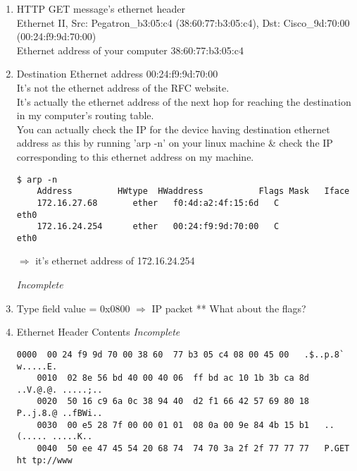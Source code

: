\documentclass[a4,11pt]{article}
\begin{document}
\begin{enumerate}
  \item HTTP GET message's ethernet header \\
      Ethernet II, Src: Pegatron\_b3:05:c4 (38:60:77:b3:05:c4), Dst: Cisco\_9d:70:00 (00:24:f9:9d:70:00) \\

      Ethernet address of your computer	38:60:77:b3:05:c4	\\

  \item Destination Ethernet address 		00:24:f9:9d:70:00	\\

  It's not the ethernet address of the RFC website. \\
  It's actually the ethernet address of the next hop for reaching the destination in my computer's routing table. \\

  You can actually check the IP for the device having destination ethernet address as this by 
  running 'arp -n' on your linux machine \& check the IP corresponding to this ethernet address on my machine.

  \begin{adjustwidth}{-2cm}{}
  \begin{lstlisting}[style=bash]
    $ arp -n
    Address     	HWtype  HWaddress           Flags Mask   Iface
    172.16.27.68       ether   f0:4d:a2:4f:15:6d   C            eth0
    172.16.24.254      ether   00:24:f9:9d:70:00   C            eth0
  \end{lstlisting}
  \end{adjustwidth}
  
  $\Rightarrow$ it's ethernet address of 172.16.24.254

  \textit{Incomplete}
  \item Type field value = 0x0800 $\Rightarrow$ IP packet
	** What about the flags?

  \item Ethernet Header Contents
  \textit{Incomplete}
  \begin{adjustwidth}{-2cm}{}
  \begin{lstlisting}[style=bash]
    0000  00 24 f9 9d 70 00 38 60  77 b3 05 c4 08 00 45 00   .$..p.8` w.....E.
    0010  02 8e 56 bd 40 00 40 06  ff bd ac 10 1b 3b ca 8d   ..V.@.@. .....;..
    0020  50 16 c9 6a 0c 38 94 40  d2 f1 66 42 57 69 80 18   P..j.8.@ ..fBWi..
    0030  00 e5 28 7f 00 00 01 01  08 0a 00 9e 84 4b 15 b1   ..(..... .....K..
    0040  50 ee 47 45 54 20 68 74  74 70 3a 2f 2f 77 77 77   P.GET ht tp://www
  \end{lstlisting}
  \end{adjustwidth}
  

\end{enumerate}
\end{document}
